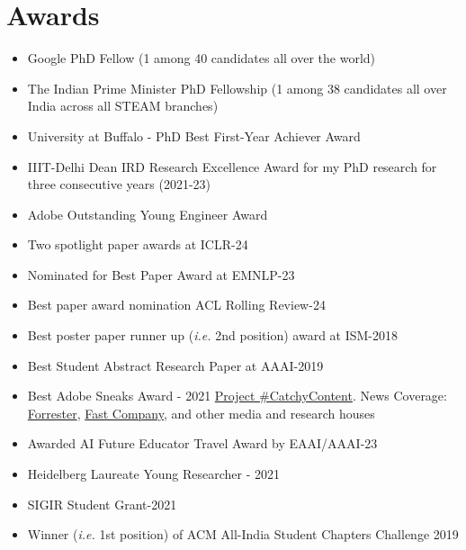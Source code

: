 \chapter*{Awards}

\begin{itemize}
     \item{Google PhD Fellow (1 among 40 candidates all over the world)}
    \item{The Indian Prime Minister PhD Fellowship (1 among 38 candidates all over India across all STEAM branches)}
    \item{University at Buffalo - PhD Best First-Year Achiever Award}
    \item{IIIT-Delhi Dean IRD Research Excellence Award for my PhD research for three consecutive years (2021-23)}
   \item{Adobe Outstanding Young Engineer Award}
    \item{Two spotlight paper awards at ICLR-24}
    \item{Nominated for Best Paper Award at EMNLP-23}
    \item{Best paper award nomination ACL Rolling Review-24}
    \item {Best poster paper runner up (\textit{i.e.} 2nd position) award at ISM-2018}
    \item {Best Student Abstract Research Paper at AAAI-2019}
    \item{Best Adobe Sneaks Award - 2021 \href{https://business.adobe.com/summit/2021/sessions/catchy-content-sneak-gs3-4.html}{Project \#CatchyContent}. News Coverage: \href{https://go.forrester.com/blogs/adobe-catchy-content-shows-how-content-intelligence-powers-personalization/}{Forrester}, \href{https://www.fastcompany.com/90629922/why-is-nobody-clicking-your-website-adobes-brutally-honest-new-ai-can-tell-you}{Fast Company}, and other media and research houses}

    \item{Awarded AI Future Educator Travel Award by EAAI/AAAI-23}
    \item{Heidelberg Laureate Young Researcher - 2021}
    \item{SIGIR Student Grant-2021}
    \item {Winner (\textit{i.e.} 1st position) of ACM All-India Student Chapters Challenge 2019}
\end{itemize}

